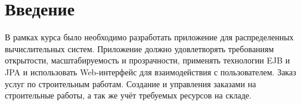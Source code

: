 





\section{Введение}
В рамках курса было необходимо разработать приложение для распределенных вычислительных систем. Приложение должно удовлетворять требованиям открытости, масштабируемость и прозрачности, применять технологии EJB и JPA и использовать Web-интерфейс для взаимодействия с пользователем.
Заказ услуг по строительным работам. Создание и управления заказами на строительные работы, а так же учёт требуемых ресурсов на складе.

